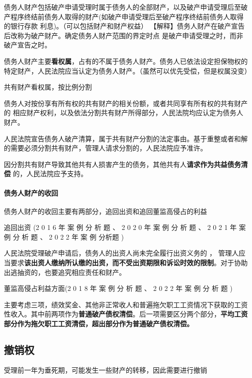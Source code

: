 \documentclass[UTF8,12pt]{ctexart}
\numberwithin{equation}{section} %
\numberwithin{figure}{section}
\numberwithin{table}{section}
\begin{document}
	
	债务人财产包括破产申请受理时属于债务人的全部财产，以及破产申请受理后至破产程序终结前债务人取得的财产(如破产申请受理后至破产程序终结前债务人取得的银行存款 利息)。（可以包括财产和财产权益）
	【解释】债务人财产在破产宣告后改称为破产财产。确定债务人财产范围的界定时点 是破产申请受理之时，而非破产宣告之时。
	
	债务人财产主要\textbf{看权属}，占有的不属于债务人财产。债务人已依法设定担保物权的特定财产，人民法院应当认定为债务人财产。（虽然可以优先受偿，但是权属没变）
	
	共有财产看权属，按比例分割
	
	债务人对按份享有所有权的共有财产的相关份额，或者共同享有所有权的共有财产的 相应财产权利，以及依法分割共有财产所得部分，人民法院均应认定为债务人财产。
	
	人民法院宣告债务人破产清算，属于共有财产分割的法定事由。基于重整或者和解的需要必须分割共有财产，管理人请求分割的，人民法院应予准许。
	
	因分割共有财产导致其他共有人损害产生的债务，其他共有人\textbf{请求作为共益债务清偿} 的，人民法院应予支持。
	
	\paragraph{债务人财产的收回}
	债务人财产的收回主要有两部分，追回出资和追回董监高侵占的利益
	
	追回出资 (2 0 1 6 年 案 例 分 析 题 、 2 0 2 0 年 案 例 分 析 题 、 2 0 2 1 年 案 例 分 析 题 、 2 0 2 2 年 案 例 分析题 )
	
	人民法院受理破产申请后，债务人的出资人尚未完全履行出资义务的 ， 管理人应当要求\textbf{该出资人缴纳所认缴的出资，而不受出资期限和诉讼时效的限制}。对于协助出逃抽资的，也要追究相应责任和财产。
	
	董监高侵占利益方面(2 0 1 8 年 案 例 分 析 题 、 2 0 2 2 年 案 例 分 析 题 ) 
	
	主要考虑三项，绩效奖金、其他非正常收人和普遍拖欠职工工资情况下获取的工资性收入。其中前两项作为\textbf{普通破产债权清偿}。后一项需要区分两个部分，\textbf{平均工资部分作为拖欠职工工资清偿，超出部分作为普通破产债权清偿。}
	
	\subsection{撤销权}
	受理前一年为垂死期，可能发生一些财产的转移，因此需要进行撤销
\end{document}
